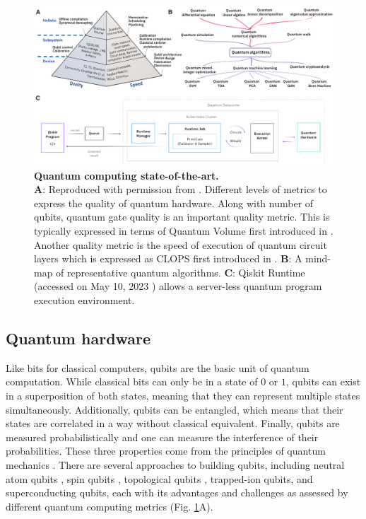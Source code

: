 \documentclass{article}
\begin{document}
\begin{figure}[H]
    \centering
\includegraphics[width=.95\columnwidth, keepaspectratio]{figures/quantum_overview_ver3.pdf}
    \caption{
    \textbf{Quantum computing state-of-the-art.}\\
    \textbf{A}: Reproduced with permission from \cite{wack2021quality}. Different levels of metrics to express the quality of quantum hardware. Along with number of qubits, quantum gate quality is an important quality metric. This is typically expressed in terms of Quantum Volume first introduced in \cite{cross2019validating}. Another quality metric is the speed of execution of quantum circuit layers which is expressed as CLOPS first introduced in \cite{wack2021quality}.  
    \textbf{B}: A mind-map of representative quantum algorithms.
    \textbf{C}: Qiskit Runtime (accessed on May 10, 2023 \cite{IBMQuantumRuntime}) allows a server-less quantum program execution environment. 
    }
    \label{fig:quantum_overview}
\end{figure}

\subsection{Quantum hardware}
Like bits for classical computers, qubits are the basic unit of quantum computation. While classical bits can only be in a state of $0$ or $1$, qubits can exist in a superposition of both states, meaning that they can represent multiple states simultaneously. Additionally, qubits can be entangled, which means that their states are correlated in a way without classical equivalent. Finally, qubits are measured probabilistically and one can measure the interference of their probabilities. These three properties come from the principles of quantum mechanics \cite{griffiths2018introduction}.
There are several approaches to building qubits, including neutral atom qubits \cite{levine2019parallel}, spin qubits \cite{burkard2021semiconductor}, topological qubits \cite{conlon2019error}, trapped-ion qubits, and superconducting qubits, each with its advantages and challenges as assessed by different quantum computing metrics (Fig. \ref{fig:quantum_overview}A). 
\end{document}
